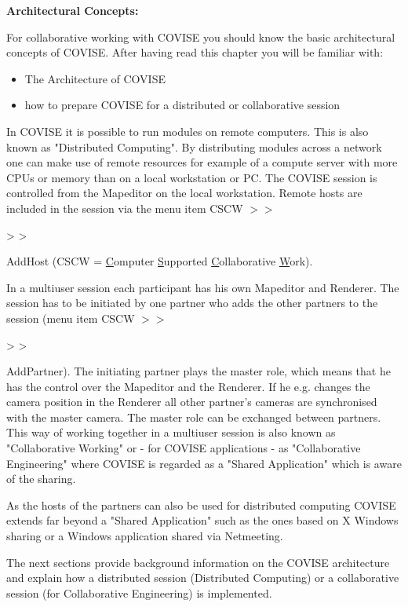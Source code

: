 {\bf Architectural Concepts:}

For collaborative working with COVISE you should know the basic architectural concepts of COVISE.
After having read this chapter you will be familiar with:

\begin{itemize}
\item The Architecture of COVISE
\item how to prepare COVISE for a distributed or collaborative session
\end{itemize}

In COVISE it is possible to run modules on remote computers. This is also known as 
"Distributed Computing". By distributing modules across a network one can make use 
of remote resources for example of a compute server with more CPUs or memory than on a 
local workstation or PC. The COVISE session is controlled from the Mapeditor on the
local workstation. Remote hosts are included in the session via the menu item 
CSCW \latexonly $>>$ \endlatexonly \begin{htmlonly} > > \end{htmlonly} AddHost (CSCW = \underline{C}omputer
\underline{S}upported \underline{C}ollaborative \underline{W}ork).

In a multiuser session each participant has his own Mapeditor and Renderer. The 
session has to be initiated by one partner who adds the other partners to the 
session (menu item CSCW \latexonly $>>$ \endlatexonly \begin{htmlonly}> > \end{htmlonly} AddPartner). The initiating partner plays the master role, 
which means that he has the control over the Mapeditor and the Renderer. If he e.g. 
changes the camera position in the Renderer all other partner's cameras are synchronised 
with the master camera. The master role can be exchanged between partners. This way of 
working together in a multiuser session is also known as "Collaborative Working" or - for COVISE
applications - as "Collaborative Engineering" where COVISE is regarded as a "Shared Application" 
which is aware of the sharing.

As the hosts of the partners can also be used for distributed computing COVISE extends 
far beyond a "Shared Application" such as the ones based on X Windows sharing or a 
Windows application shared via Netmeeting.

The next sections provide background information on the COVISE architecture and explain how a 
distributed session (Distributed Computing) or a collaborative 
session (for Collaborative Engineering) is implemented.

